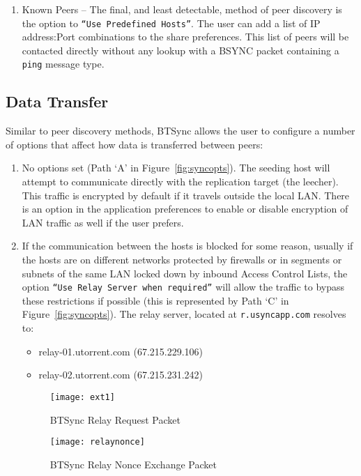 \documentclass[final,5p,times,twocolumn]{elsarticle}
\begin{document}
\begin{enumerate}
\item Known Peers -- The final, and least detectable, method of peer discovery is the option to \texttt{``Use Predefined Hosts''}. The user can add a list of IP address:Port combinations to the share preferences. This list of peers will be contacted directly without any lookup with a BSYNC packet containing a \texttt{ping} message type. 
\end{enumerate}

\subsection{Data Transfer}
\label{transfer}
Similar to peer discovery methods, BTSync allows the user to configure a number of options that affect how data is transferred between peers:

\begin{enumerate}
\item No options set (Path `A' in Figure~\ref{fig:syncopts}). The seeding host will attempt to communicate directly with the replication target (the leecher). This traffic is encrypted by default if it travels outside the local LAN. There is an option in the application preferences to enable or disable encryption of LAN traffic as well if the user prefers.

\item If the communication between the hosts is blocked for some reason, usually if the hosts are on different networks protected by firewalls or in segments or subnets of the same LAN locked down by inbound Access Control Lists, the option \texttt{``Use Relay Server when required''} will allow the traffic to bypass these restrictions if possible (this is represented by Path `C' in Figure~\ref{fig:syncopts}). The relay server, located at \texttt{r.usyncapp.com} resolves to:
\begin{itemize}
\item relay-01.utorrent.com (67.215.229.106)
\item relay-02.utorrent.com (67.215.231.242)
\end{itemize}

\begin{figure}[!h]
\centering
\texttt{[image: ext1]}
\caption{BTSync Relay Request Packet}
\label{BTSyncRelay}
\end{figure}

\begin{figure}[!h]
\centering
\texttt{[image: relaynonce]}
\caption{BTSync Relay Nonce Exchange Packet}
\label{BTSyncNonce}
\end{figure}


\end{enumerate}
\end{document}
